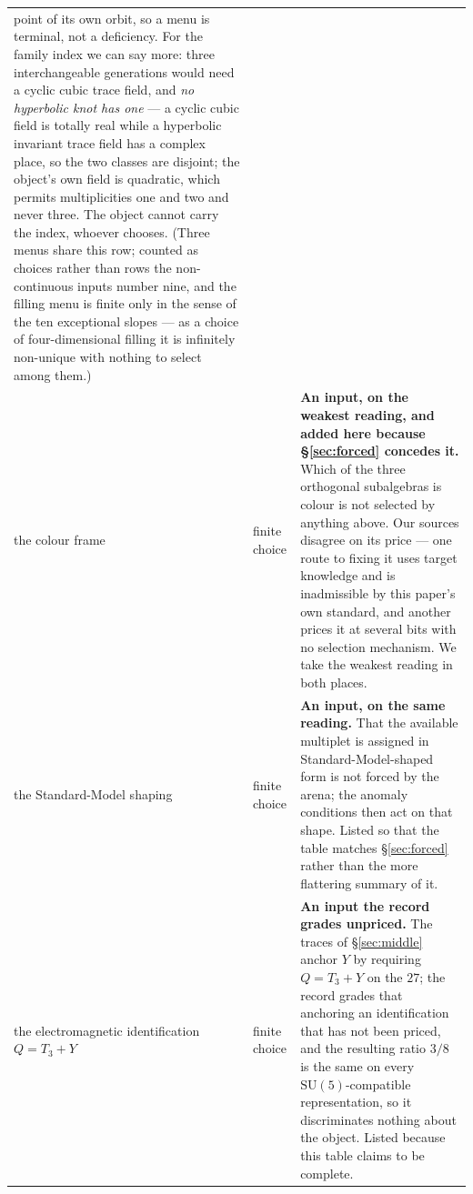 \documentclass[11pt,a4paper]{article}
\theoremstyle{definition}
\theoremstyle{remark}
\begin{document}
\begin{longtable}{@{}>{\raggedright\arraybackslash}p{3.2cm}>{\raggedright\arraybackslash}p{2.7cm}>{\raggedright\arraybackslash}p{8.4cm}@{}}
point of its own orbit, so a menu is terminal, not a deficiency. For the family index we can say more: three interchangeable
generations would need a cyclic cubic trace field, and \emph{no hyperbolic knot has one} --- a cyclic cubic field is totally
real while a hyperbolic invariant trace field has a complex place, so the two classes are disjoint; the object's own field is
quadratic, which permits multiplicities one and two and never three. The object cannot carry the index, whoever chooses.
(Three menus share this row; counted as choices rather than rows the non-continuous inputs number nine, and the filling
menu is finite only in the sense of the ten exceptional slopes --- as a choice of four-dimensional filling it is infinitely
non-unique with nothing to select among them.) \\[2pt]
the colour frame & finite choice &
\textbf{An input, on the weakest reading, and added here because \S\ref{sec:forced} concedes it.}
Which of the three orthogonal subalgebras is colour is not selected by anything above. Our sources
disagree on its price --- one route to fixing it uses target knowledge and is inadmissible by this
paper's own standard, and another prices it at several bits with no selection mechanism. We take the
weakest reading in both places. \\[2pt]
the Standard-Model shaping & finite choice &
\textbf{An input, on the same reading.} That the available multiplet is assigned in
Standard-Model-shaped form is not forced by the arena; the anomaly conditions then act on that
shape. Listed so that the table matches \S\ref{sec:forced} rather than the more flattering summary
of it. \\[2pt]
the electromagnetic identification $Q = T_3 + Y$ & finite choice &
\textbf{An input the record grades unpriced.} The traces of \S\ref{sec:middle} anchor $Y$ by requiring $Q = T_3 + Y$ on
the $27$; the record grades that anchoring an identification that has not been priced, and the resulting ratio $3/8$ is the
same on every $\mathrm{SU}(5)$-compatible representation, so it discriminates nothing about the object. Listed because this
table claims to be complete. \\
\bottomrule
\end{longtable}
\endgroup
\end{document}
